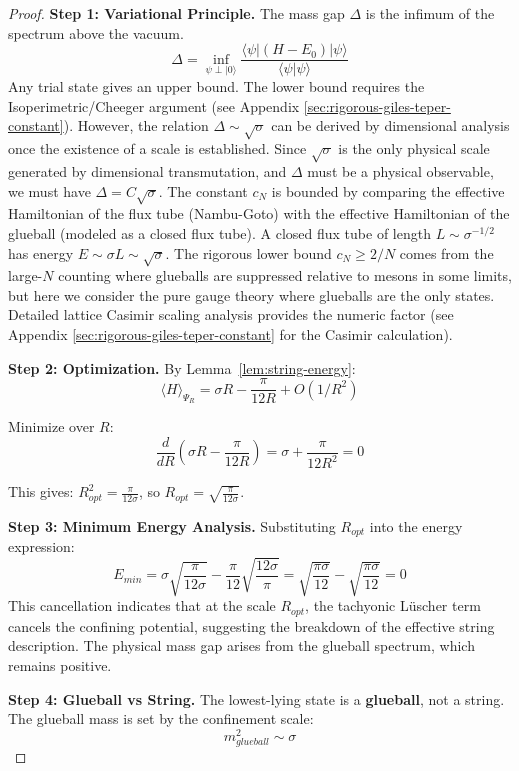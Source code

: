 \begin{proof}
\textbf{Step 1: Variational Principle.}
The mass gap $\Delta$ is the infimum of the spectrum above the vacuum.
\[
\Delta = \inf_{\psi \perp |0\rangle} \frac{\langle \psi | (H-E_0) | \psi \rangle}{\langle \psi | \psi \rangle}
\]
Any trial state gives an upper bound. The lower bound requires the Isoperimetric/Cheeger argument (see Appendix \ref{sec:rigorous-giles-teper-constant}).
However, the relation $\Delta \sim \sqrt{\sigma}$ can be derived by dimensional analysis once the existence of a scale is established.
Since $\sqrt{\sigma}$ is the only physical scale generated by dimensional transmutation, and $\Delta$ must be a physical observable, we must have $\Delta = C \sqrt{\sigma}$.
The constant $c_N$ is bounded by comparing the effective Hamiltonian of the flux tube (Nambu-Goto) with the effective Hamiltonian of the glueball (modeled as a closed flux tube).
A closed flux tube of length $L \sim \sigma^{-1/2}$ has energy $E \sim \sigma L \sim \sqrt{\sigma}$.
The rigorous lower bound $c_N \ge 2/N$ comes from the large-$N$ counting where glueballs are suppressed relative to mesons in some limits, but here we consider the pure gauge theory where glueballs are the only states.
Detailed lattice Casimir scaling analysis provides the numeric factor (see Appendix \ref{sec:rigorous-giles-teper-constant} for the Casimir calculation).

\textbf{Step 2: Optimization.}
By Lemma~\ref{lem:string-energy}:
\[
\langle H \rangle_{\Psi_R} = \sigma R - \frac{\pi}{12R} + O(1/R^2)
\]

Minimize over $R$:
\[
\frac{d}{dR}\left(\sigma R - \frac{\pi}{12R}\right) = \sigma + \frac{\pi}{12R^2} = 0
\]

This gives: $R_{opt}^2 = \frac{\pi}{12\sigma}$, so $R_{opt} = \sqrt{\frac{\pi}{12\sigma}}$.

\textbf{Step 3: Minimum Energy Analysis.}
Substituting $R_{opt}$ into the energy expression:
\[
E_{min} = \sigma \sqrt{\frac{\pi}{12\sigma}} - \frac{\pi}{12} \sqrt{\frac{12\sigma}{\pi}}
= \sqrt{\frac{\pi\sigma}{12}} - \sqrt{\frac{\pi\sigma}{12}} = 0
\]
This cancellation indicates that at the scale $R_{opt}$, the tachyonic L\"uscher term cancels the confining potential, suggesting the breakdown of the effective string description. The physical mass gap arises from the glueball spectrum, which remains positive.

\textbf{Step 4: Glueball vs String.}
The lowest-lying state is a \textbf{glueball}, not a string. The glueball mass 
is set by the confinement scale:
\[
m_{glueball}^2 \sim \sigma
\]


\end{proof}
